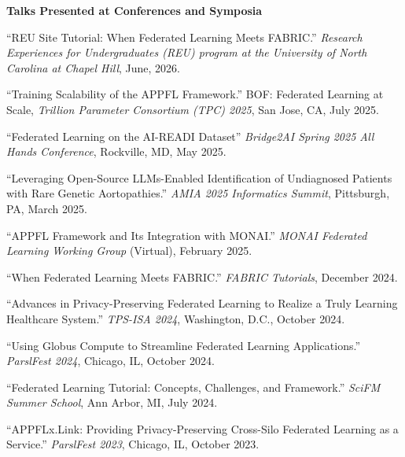 \documentclass[letterpaper,11pt]{article}
\newcommand{\PubSection}[1]{%
  \vspace{6pt}\noindent\textbf{#1}\vspace{3pt}%
}
\begin{document}
\PubSection{Talks Presented at Conferences and Symposia}
\begin{enumerate}[leftmargin=1cm, label={[\arabic*]}, itemsep=3pt]
  \small
  \item ``REU Site Tutorial: When Federated Learning Meets FABRIC.'' \textit{Research Experiences for Undergraduates (REU) program at the University of North Carolina at Chapel Hill}, June, 2026.
  \item ``Training Scalability of the APPFL Framework.'' BOF: Federated Learning at Scale, \textit{Trillion Parameter Consortium (TPC) 2025}, San Jose, CA, July 2025.

  \item ``Federated Learning on the AI-READI Dataset'' \textit{Bridge2AI Spring 2025 All Hands Conference}, Rockville, MD, May 2025.

  \item ``Leveraging Open-Source LLMs-Enabled Identification of Undiagnosed Patients with Rare Genetic Aortopathies.'' \textit{AMIA 2025 Informatics Summit}, Pittsburgh, PA, March 2025.

  \item ``APPFL Framework and Its Integration with MONAI.'' \textit{MONAI Federated Learning Working Group} (Virtual), February 2025.

  \item ``When Federated Learning Meets FABRIC.'' \textit{FABRIC Tutorials}, December 2024.

  \item ``Advances in Privacy-Preserving Federated Learning to Realize a Truly Learning Healthcare System.'' \textit{TPS-ISA 2024}, Washington, D.C., October 2024.

  \item ``Using Globus Compute to Streamline Federated Learning Applications.'' \textit{ParslFest 2024}, Chicago, IL, October 2024.

  \item ``Federated Learning Tutorial: Concepts, Challenges, and Framework.'' \textit{SciFM Summer School}, Ann Arbor, MI, July 2024.

  \item ``APPFLx.Link: Providing Privacy-Preserving Cross-Silo Federated Learning as a Service.'' \textit{ParslFest 2023}, Chicago, IL, October 2023.
\end{enumerate}

\end{document}
